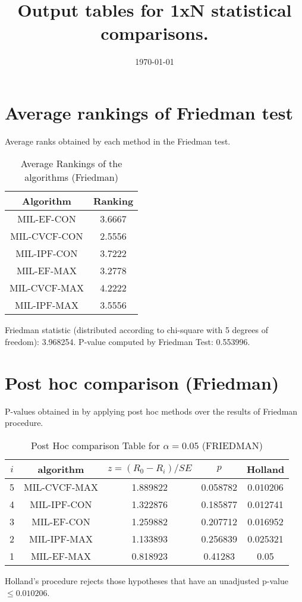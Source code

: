 \documentclass[a4paper,10pt]{article}
\title{Output tables for 1xN statistical comparisons.}
\author{}
\date{\today}
\begin{document}
\begin{landscape}
\pagestyle{empty}
\maketitle
\thispagestyle{empty}

\section{Average rankings of Friedman test}


Average ranks obtained by each method in the Friedman test.

\begin{table}[!htp]
\centering
\begin{tabular}{|c|c|}\hline
Algorithm&Ranking\\\hline
MIL-EF-CON&3.6667\\MIL-CVCF-CON&2.5556\\MIL-IPF-CON&3.7222\\MIL-EF-MAX&3.2778\\MIL-CVCF-MAX&4.2222\\MIL-IPF-MAX&3.5556\\\hline\end{tabular}
\caption{Average Rankings of the algorithms (Friedman)}
\end{table}

Friedman statistic (distributed according to chi-square with 5 degrees of freedom): 3.968254. \newline P-value computed by Friedman Test: 0.553996.\newline


\newpage

\section{Post hoc comparison (Friedman)}


P-values obtained in by applying post hoc methods over the results of Friedman procedure.

\begin{table}[!htp]
\centering\footnotesize
\begin{tabular}{ccccc}
$i$&algorithm&$z=(R_0 - R_i)/SE$&$p$&Holland\\
\hline5&MIL-CVCF-MAX&1.889822&0.058782&0.010206\\4&MIL-IPF-CON&1.322876&0.185877&0.012741\\3&MIL-EF-CON&1.259882&0.207712&0.016952\\2&MIL-IPF-MAX&1.133893&0.256839&0.025321\\1&MIL-EF-MAX&0.818923&0.41283&0.05\\\hline
\end{tabular}
\caption{Post Hoc comparison Table for $\alpha=0.05$ (FRIEDMAN)}
\end{table}Holland's procedure rejects those hypotheses that have an unadjusted p-value $\le0.010206$.



\end{landscape}
\end{document}
